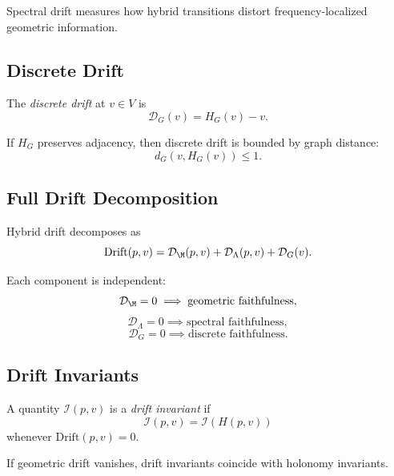 \begin{remark}
Spectral drift measures how hybrid transitions distort frequency-localized
geometric information.
\end{remark}

\subsection{Discrete Drift}

\begin{definition}
The \emph{discrete drift} at $v \in V$ is
\[
\mathcal{D}_G(v)
= H_G(v) - v.
\]
\end{definition}

\begin{lemma}
If $H_G$ preserves adjacency, then discrete drift is bounded by graph
distance:
\[
d_G(v, H_G(v)) \le 1.
\]
\end{lemma}

\subsection{Full Drift Decomposition}

\begin{theorem}
Hybrid drift decomposes as
\[
\mathrm{Drift}(p,v)
= \mathcal{D}_\M(p,v)
+ \mathcal{D}_\Lambda(p,v)
+ \mathcal{D}_G(v).
\]
\end{theorem}

\begin{lemma}
Each component is independent:
\[
\mathcal{D}_\M = 0 \implies \text{geometric faithfulness},
\]
\[
\mathcal{D}_\Lambda = 0 \implies \text{spectral faithfulness},
\]
\[
\mathcal{D}_G = 0 \implies \text{discrete faithfulness}.
\]
\]
\end{lemma}

\subsection{Drift Invariants}

\begin{definition}
A quantity $\mathcal{I}(p,v)$ is a \emph{drift invariant} if
\[
\mathcal{I}(p,v) = \mathcal{I}(H(p,v))
\]
whenever $\mathrm{Drift}(p,v) = 0$.
\end{definition}

\begin{lemma}
If geometric drift vanishes, drift invariants coincide with holonomy
invariants.
\end{lemma}

